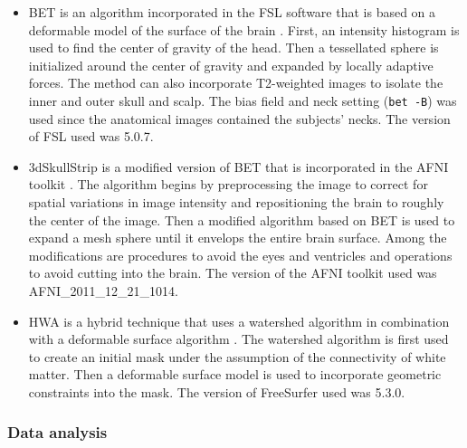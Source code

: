\begin{itemize}
    \item BET is an algorithm incorporated in the FSL software that is based on a deformable model of the surface of the brain \cite{Smith2002}. First, an intensity histogram is used to find the center of gravity of the head. Then a tessellated sphere is initialized around the center of gravity and expanded by locally adaptive forces. The method can also incorporate T2-weighted images to isolate the inner and outer skull and scalp. The bias field and neck setting ({\tt bet -B}) was used since the anatomical images contained the subjects' necks. The version of FSL used was 5.0.7.

    \item 3dSkullStrip is a modified version of BET that is incorporated in the AFNI toolkit \cite{afni}. The algorithm begins by preprocessing the image to correct for spatial variations in image intensity and repositioning the brain to roughly the center of the image. Then a modified algorithm based on BET is used to expand a mesh sphere until it envelops the entire brain surface. Among the modifications are procedures to avoid the eyes and ventricles and operations to avoid cutting into the brain. The version of the AFNI toolkit used was AFNI\_2011\_12\_21\_1014.

    \item HWA is a hybrid technique that uses a watershed algorithm in combination with a deformable surface algorithm \cite{Segonne2004}. The watershed algorithm is first used to create an initial mask under the assumption of the connectivity of white matter. Then a deformable surface model is used to incorporate geometric constraints into the mask. The version of FreeSurfer used was 5.3.0.
\end{itemize}



\subsubsection*{Data analysis}

